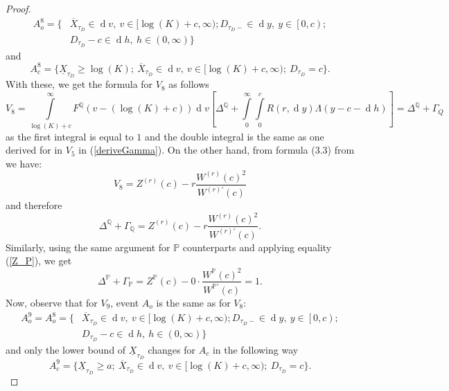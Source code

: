\documentclass[10pt,a4paper]{amsart}
\def\P{{\mathbb{P}}}
\def\Q{{\mathbb{Q}}}
\newcommand{\dx}{\operatorname{d}\!}
\def\P{{\mathbb P}} \def\le{\left} \def\ri{\right} \def\i{\infty}
\begin{document}
\begin{proof}
			\begin{align*}
				A_o^8 = \{& \overline{X}_{\tau_D} \in \dx v,\ v \in [\log(K)+c, \infty); D_{\tau_D-} \in \dx y,\ y \in \left[ 0,c \right); \\ \nonumber & D_{\tau_D} - c \in \dx h,\ h \in (0, \infty)
				\}
			\end{align*}
and
			\begin{equation*}
				A_c^8 = \{ \underline{X}_{\tau_D} \geq \log(K);\ \overline{X}_{\tau_D} \in \dx v,\ v \in [\log(K)+c,\infty);\  D_{\tau_D} =c \}.
			\end{equation*}
			With these, we get the formula for $V_8$ as follows
			\begin{equation*}
				V_8 = \int\limits_{\log(K)+c}^{\infty}F^\Q(v-(\log(K)+c))\dx v \left[ \Delta^\Q + \int\limits_{0}^{\infty}\int\limits_{0}^{c} R(r,\dx y) 	\Lambda(y-c-\dx h)  \right] = \Delta^\Q + \Gamma_Q
			\end{equation*}	
			as the first integral is equal to $1$ and the double integral is the same as one derived for in $V_5$ in (\ref{deriveGamma}). On the other hand, from formula (3.3) from \cite{MP} we have:
			\begin{equation*}
				V_8 = Z^{(r)}(c) - r\frac{W^{(r)}(c)^2}{W^{(r)'}(c)}
			\end{equation*}
			and therefore
			\begin{equation}\label{delta_gamma}
				\Delta^\Q + \Gamma_\Q = Z^{(r)}(c) - r\frac{W^{(r)}(c)^2}{W^{(r)'}(c)}.
			\end{equation}		
			Similarly, using the same argument for $\P$ counterparts and applying equality (\ref{Z_P}), we get
			\begin{equation*}
				\Delta^\P + \Gamma_\P = Z^{\P}(c) - 0\cdot\frac{W^{\P}(c)^2}{W^{\P'}(c)} = 1.
			\end{equation*}
			Now, observe that for $V_9$, event $A_o$ is the same as for $V_8$: 
			\begin{align*}
				A_o^9 =  A_o^8 = \{& \overline{X}_{\tau_D} \in \dx v,\ v \in [\log(K)+c, \infty); D_{\tau_D-} \in \dx y,\ y \in \left[ 0,c \right); \\ \nonumber & D_{\tau_D} - c \in \dx h,\ h \in (0, \infty)
				\}
			\end{align*}
and only the lower bound of $\underline{X}_{\tau_D}$ changes for $A_c$ in the following way
			\begin{equation*}
				A_c^9 = \{ \underline{X}_{\tau_D} \geq a;\ \overline{X}_{\tau_D} \in \dx v,\ v \in [\log(K)+c,\infty);\  D_{\tau_D} =c \}.
			\end{equation*}	
			

\end{proof}
\end{document}
